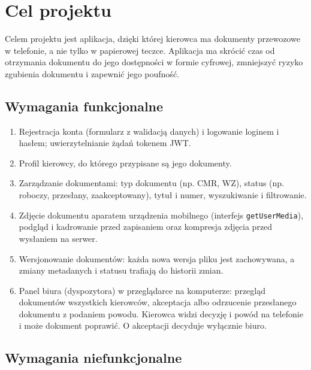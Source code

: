 \section{Cel projektu}
\label{sec:cel}

Celem projektu jest aplikacja, dzięki której kierowca ma dokumenty przewozowe
w telefonie, a nie tylko w papierowej teczce. Aplikacja ma skrócić czas od
otrzymania dokumentu do jego dostępności w formie cyfrowej, zmniejszyć ryzyko
zgubienia dokumentu i zapewnić jego poufność.

\subsection{Wymagania funkcjonalne}

\begin{enumerate}
  \item Rejestracja konta (formularz z walidacją danych) i logowanie loginem
        i hasłem; uwierzytelnianie żądań tokenem JWT.
  \item Profil kierowcy, do którego przypisane są jego dokumenty.
  \item Zarządzanie dokumentami: typ dokumentu (np. CMR, WZ), status
        (np. roboczy, przesłany, zaakceptowany), tytuł i numer, wyszukiwanie
        i filtrowanie.
  \item Zdjęcie dokumentu aparatem urządzenia mobilnego
        (interfejs \texttt{getUserMedia}), podgląd i kadrowanie przed zapisaniem
        oraz kompresja zdjęcia przed wysłaniem na serwer.
  \item Wersjonowanie dokumentów: każda nowa wersja pliku jest zachowywana,
        a zmiany metadanych i statusu trafiają do historii zmian.
  \item Panel biura (dyspozytora) w przeglądarce na komputerze: przegląd
        dokumentów wszystkich kierowców, akceptacja albo odrzucenie przesłanego
        dokumentu z podaniem powodu. Kierowca widzi decyzję i powód na telefonie
        i może dokument poprawić. O akceptacji decyduje wyłącznie biuro.
\end{enumerate}

\subsection{Wymagania niefunkcjonalne}

